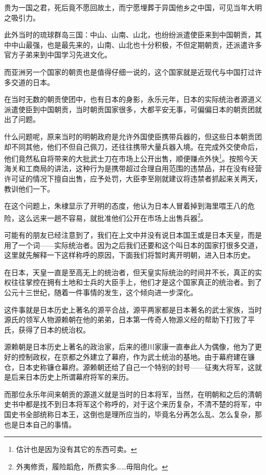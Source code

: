 \begin{multicols}{\theparacolNo}
贵为一国之君，死后竟不愿回故土，而宁愿埋葬于异国他乡之中国，可见当年大明之吸引力。

此外当时的琉球群岛三国：中山、山南、山北，也纷纷派遣使臣来到中国朝贡，其中中山最强，也是最先来的，山南、山北也十分积极，不但定期朝贡，还派遣许多官方子弟来到中国学习先进文化。

而亚洲另一个国家的朝贡也是值得仔细一说的，这个国家就是近现代与中国打过许多交道的日本。

在当时无数的朝贡使团中，也有日本的身影，永乐元年，日本的实际统治者源道义派遣使臣到中国朝贡，当时朝贡国家很多，大都平安无事，可偏偏日本的朝贡团就出了问题。

什么问题呢，原来当时的明朝政府是允许外国使臣携带兵器的，但这些日本朝贡团却不同其他，他们不但自己佩刀，还往往携带大量兵器入境。在完成外交使命后，他们竟然私自将带来的大批武士刀在市场上公开出售，顺便赚点外快\footnote{估计也是因为没有其它的东西可卖。}。按照今天海关和工商局的讲法，这种行为是携带超过合理自用范围的违禁品，并在没有经营许可证的情况下擅自出售，应予处罚，大臣李至刚就建议将违禁者抓起来关两天，教训他们一下。

在这个问题上，朱棣显示了开明的态度，他认为日本人冒着掉到海里喂王八的危险，这么远来一趟不容易，就批准他们公开在市场上出售兵器\footnote{外夷修贡，履险蹈危，所费实多……毋阻向化。}。

可能有的朋友已经注意到了，我们在上文中并没有说日本国王或是日本天皇，而是用了一个词——实际统治者。因为之后我们还要和这个叫日本的国家打很多交道，这里就先解释一下这样称呼的原因，下面我们将暂时离开明朝，进入日本历史。

在日本，天皇一直是至高无上的统治者，但天皇实际统治的时间并不长，真正的实权往往掌控在拥有土地和士兵的大臣手上，他们才是这个国家真正的统治者。到了公元十三世纪，随着一件事情的发生，这个倾向进一步深化。

这件事就是日本历史上著名的源平合战，源平两家都是日本著名的武士家族，当时源氏的领军人物源赖朝在他的弟弟，日本第一传奇人物源义经的帮助下打败了平氏，获得了日本的统治权。

源赖朝是日本历史上著名的政治家，后来的德川家康一直奉此人为偶像，他为了更好的控制政权，在京都之外建立了幕府，作为武士统治的基地。由于幕府建在镰仓，日本史称镰仓幕府。源赖朝还给了自己一个特别的封号——征夷大将军，这就是后来日本历史上所谓幕府将军的来历。

而那位永乐年间来朝贡的源道义就是当时的日本将军，当然，在明朝和之后的清朝史书中都是找不到日本将军这个称呼的，对于这个来历复杂，不清不楚的将军，中国史书全部统称日本王，这倒也是理所应当的，毕竟名分再怎么乱、怎么复杂，那也是日本自己的事情。


\end{multicols}
